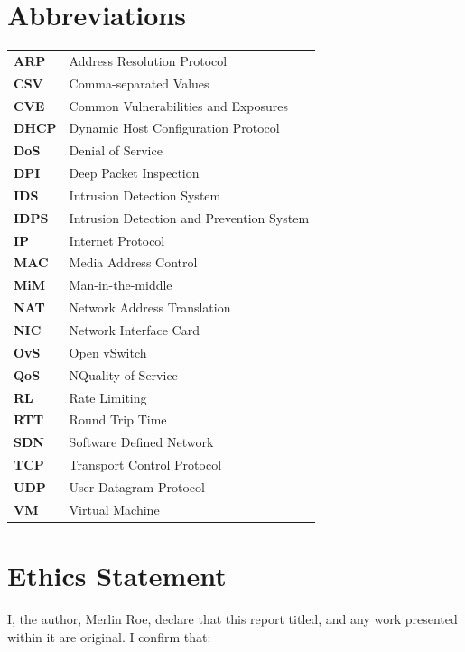 \documentclass[12pt, oneside]{book}
\begin{document}
\newpage

\chapter{Abbreviations}

\begin{table}[H]
	\begin{tabular}{l l}
		\textbf{ARP}	 	& Address Resolution Protocol  \\
		\textbf{CSV}	 	& Comma-separated Values \\
		\textbf{CVE}	 	& Common Vulnerabilities and Exposures \\
		\textbf{DHCP}	 	& Dynamic Host Configuration Protocol \\
		\textbf{DoS}	 	& Denial of Service \\ 
		\textbf{DPI}	 	& Deep Packet Inspection \\ 
		\textbf{IDS}	 	& Intrusion Detection System \\ 
		\textbf{IDPS}	 	& Intrusion Detection and Prevention System \\
		\textbf{IP}	 		& Internet Protocol \\
		\textbf{MAC}	 	& Media Address Control \\
		\textbf{MiM}	 	& Man-in-the-middle \\
		\textbf{NAT}	 	& Network Address Translation \\
		\textbf{NIC}	 	& Network Interface Card\\
		\textbf{OvS}	 	& Open vSwitch \\
		\textbf{QoS}	 	& NQuality of Service \\
		\textbf{RL}	 		& Rate Limiting \\
		\textbf{RTT}	 	& Round Trip Time\\
		\textbf{SDN}	 	& Software Defined Network\\
		\textbf{TCP}	 	& Transport Control Protocol\\
		\textbf{UDP}	 	& User Datagram Protocol\\
		\textbf{VM}	 		& Virtual Machine \\
	\end{tabular}
\end{table}

\chapter{Ethics Statement}
I, the author, Merlin Roe, declare that this report titled, {\thesisTitle} and
any work presented within it are original. I confirm that:
\end{document}
